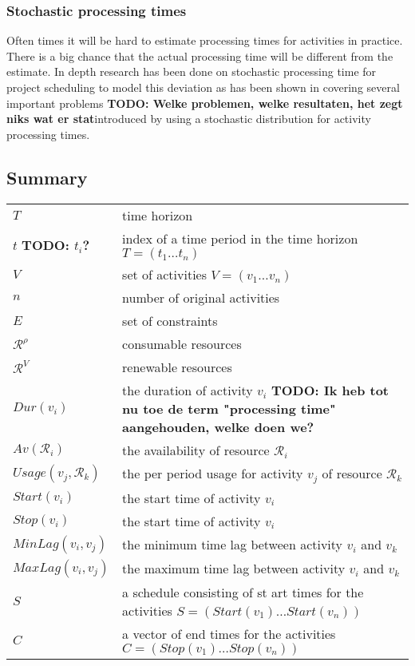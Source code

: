 \documentclass{article}
\newcommand{\TODO}[1]{{\color{red}\textbf{TODO: #1}}}
\begin{document}
\subsubsection{Stochastic processing times}
Often times it will be hard to estimate processing times for activities in practice.
There is a big chance that the actual processing time will be  different from the estimate.
In depth research has been done on stochastic processing time for project scheduling to model this deviation as has been shown in \cite{brucker99} covering several important problems \TODO{Welke problemen, welke resultaten, het zegt niks wat er stat}introduced by using a stochastic distribution for activity processing times.

\subsection{Summary}
\begin{tabular}{l l}
\hline
$T$ & time horizon \\
$t$ \TODO{$t_i$?} &  index of a time period in the time horizon $T = (t_1 \ldots t_n)$\\
$V$ & set of activities $V = (v_1 \ldots v_n)$ \\
$n$ & number of original activities \\
$E$ & set of constraints \\
$\mathcal{R}^{\rho}$ & consumable resources \\
$\mathcal{R}^V$ & renewable resources \\
$Dur(v_i)$ & the duration of activity $v_i$ \TODO{Ik heb tot nu toe de term "processing time" aangehouden, welke doen we?}\\
$Av(\mathcal{R}_i)$ & the availability of resource $\mathcal{R}_i$ \\
$Usage(v_j, \mathcal{R}_k)$ & the per period usage for activity $v_j$ of resource $\mathcal{R}_k$ \\
$Start(v_i)$ & the start time of activity $v_i$ \\
$Stop(v_i)$ & the start time of activity $v_i$ \\
$MinLag(v_i, v_j)$ & the minimum time lag between activity $v_i$ and $v_k$ \\
$MaxLag(v_i, v_j)$ & the maximum time lag between activity $v_i$ and $v_k$ \\
$S$ & a schedule consisting of st
art times for the activities $S = (Start(v_1) \ldots Start(v_n))$ \\
$C$ & a vector of end times for the activities $C = (Stop(v_1) \ldots Stop(v_n))$ \\
\hline
\end{tabular}
\end{document}
